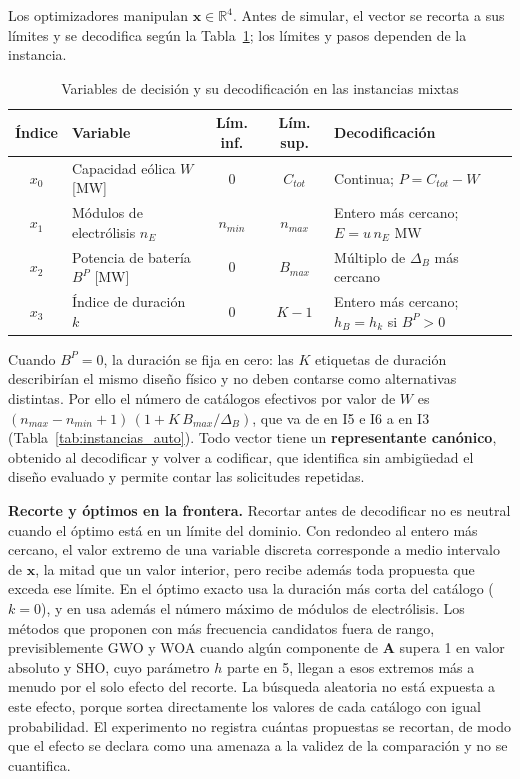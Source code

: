 Los optimizadores manipulan $\mathbf{x}\in\mathbb{R}^4$. Antes de simular, el vector se recorta a sus límites y se decodifica según la Tabla~\ref{tab:espacio_decision}; los límites y pasos dependen de la instancia.

\begin{table}[H]
\centering
\footnotesize
\caption{Variables de decisión y su decodificación en las instancias mixtas}
\label{tab:espacio_decision}
\renewcommand{\arraystretch}{1.2}
\begin{tabular}{c p{3.7cm} c c p{5.6cm}}
\hline
\textbf{Índice} & \textbf{Variable} & \textbf{Lím. inf.} & \textbf{Lím. sup.} & \textbf{Decodificación} \\
\hline
$x_0$ & Capacidad eólica $W$ [MW] & 0 & $C_{tot}$ & Continua; $P=C_{tot}-W$ \\
$x_1$ & Módulos de electrólisis $n_E$ & $n_{min}$ & $n_{max}$ & Entero más cercano; $E=u\,n_E$ MW \\
$x_2$ & Potencia de batería $B^P$ [MW] & 0 & $B_{max}$ & Múltiplo de $\Delta_B$ más cercano \\
$x_3$ & Índice de duración $k$ & 0 & $K-1$ & Entero más cercano; $h_B=h_k$ si $B^P>0$ \\
\hline
\end{tabular}
\end{table}

Cuando $B^P=0$, la duración se fija en cero: las $K$ etiquetas de duración describirían el mismo diseño físico y no deben contarse como alternativas distintas. Por ello el número de catálogos efectivos por valor de $W$ es $(n_{max}-n_{min}+1)\,(1+K\,B_{max}/\Delta_B)$, que va de \InstCatalogsE{} en I5 e I6 a \InstCatalogsC{} en I3 (Tabla~\ref{tab:instancias_auto}). Todo vector tiene un \textbf{representante canónico}, obtenido al decodificar y volver a codificar, que identifica sin ambigüedad el diseño evaluado y permite contar las solicitudes repetidas.

\textbf{Recorte y óptimos en la frontera.} Recortar antes de decodificar no es neutral cuando el óptimo está en un límite del dominio. Con redondeo al entero más cercano, el valor extremo de una variable discreta corresponde a medio intervalo de $\mathbf{x}$, la mitad que un valor interior, pero recibe además toda propuesta que exceda ese límite. En \BoundaryDurationInstances{} el óptimo exacto usa la duración más corta del catálogo ($k=0$), y en \BoundaryUnitsInstances{} usa además el número máximo de módulos de electrólisis. Los métodos que proponen con más frecuencia candidatos fuera de rango, previsiblemente GWO y WOA cuando algún componente de $\mathbf{A}$ supera 1 en valor absoluto y SHO, cuyo parámetro $h$ parte en 5, llegan a esos extremos más a menudo por el solo efecto del recorte. La búsqueda aleatoria no está expuesta a este efecto, porque sortea directamente los valores de cada catálogo con igual probabilidad. El experimento no registra cuántas propuestas se recortan, de modo que el efecto se declara como una amenaza a la validez de la comparación y no se cuantifica.

